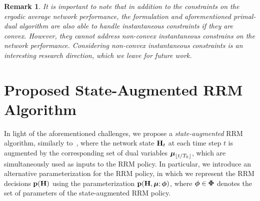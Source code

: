 \documentclass[lettersize,journal]{IEEEtran}
\newtheorem{remark}{\hspace{0pt}\bf Remark}
\def\E{\mathbb{E}}
\newcommand{\nn}[1]{{\textcolor{red}{[\textit{Navid: #1}]}}}
\begin{document}


\begin{remark}
It is important to note that in addition to the constraints on the ergodic average network performance, the formulation and aforementioned primal-dual algorithm are also able to handle instantaneous constraints if they are convex. However, they cannot address non-convex instantaneous constrains on the network performance. Considering non-convex instantaneous constraints is an interesting research direction, which we leave for future work.
\end{remark}

\section{Proposed State-Augmented RRM Algorithm}\label{sec:alg}


In light of the aforementioned challenges, we propose a 
\emph{state-augmented} RRM algorithm, similarly to~\cite{calvo2021state}, where the network state ${\mathbf H}_t$ at each time step $t$ is augmented by the corresponding set of dual variables $\boldsymbol{\mu}_{\lfloor t/T_0 \rfloor}$, which are simultaneously used as inputs to the RRM policy. In particular, we introduce an alternative parameterization for the RRM policy, in which we represent the RRM decisions ${\mathbf p}({\mathbf H})$ using the parameterization ${\mathbf p}({\mathbf H}, \boldsymbol{\mu}; \boldsymbol{\phi})$, where $\boldsymbol{\phi}\in\boldsymbol{\Phi}$ denotes the set of parameters of the state-augmented RRM policy.
\end{document}
